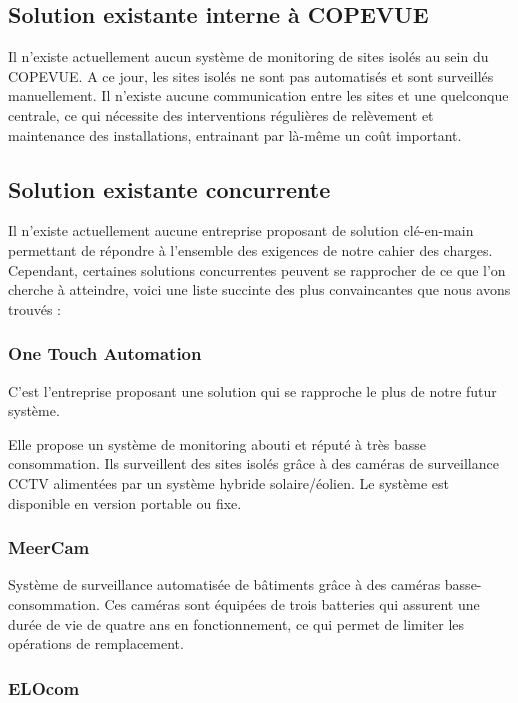 \subsection{Solution existante interne à COPEVUE}

Il n'existe actuellement aucun système de monitoring de sites isolés au sein du COPEVUE. A ce jour, les sites isolés ne sont pas automatisés et sont surveillés manuellement. Il n'existe aucune communication entre les sites et une quelconque centrale, ce qui nécessite des interventions régulières de relèvement et maintenance des installations, entrainant par là-même un coût important.

\subsection{Solution existante concurrente}

Il n'existe actuellement aucune entreprise proposant de solution clé-en-main permettant de répondre à l'ensemble des exigences de notre cahier des charges. Cependant, certaines solutions concurrentes peuvent se rapprocher de ce que l'on cherche à atteindre, voici une liste succinte des plus convaincantes que nous avons trouvés :

\subsubsection{One Touch Automation}

C'est l'entreprise proposant une solution qui se rapproche le plus de notre futur système.

Elle propose un système de monitoring abouti et réputé à très basse consommation. Ils surveillent des sites isolés grâce à des caméras de surveillance CCTV alimentées par un système hybride solaire/éolien. Le système est disponible en version portable ou fixe.

\subsubsection{MeerCam}

Système de surveillance automatisée de bâtiments grâce à des caméras basse-consommation. Ces caméras sont équipées de trois batteries qui assurent une durée de vie de quatre ans en fonctionnement, ce qui permet de limiter les opérations de remplacement.

\subsubsection{ELOcom}

